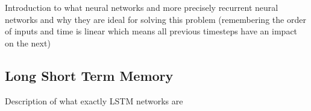 \documentclass[../main.tex]{subfiles}
\begin{document}
Introduction to what neural networks and more precisely recurrent neural networks and why they are ideal for solving this problem (remembering the order of inputs and time is linear which means all previous timesteps have an impact on the next)

\subsection{Long Short Term Memory}
Description of what exactly LSTM networks are
\end{document}
